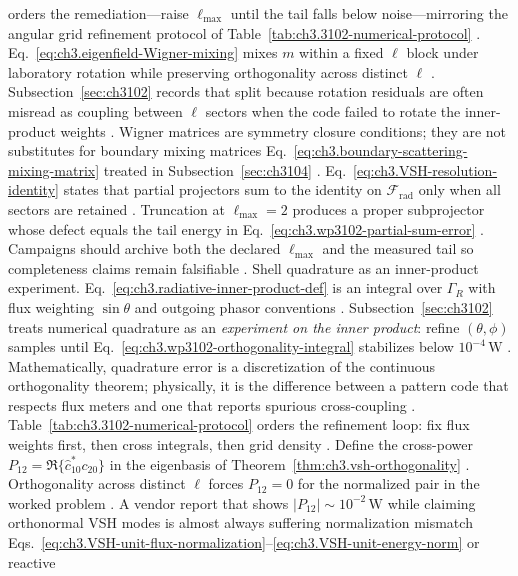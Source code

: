orders the remediation---raise \(\ell_{\max}\) until the tail falls below noise---mirroring the angular grid refinement protocol of
Table~\ref{tab:ch3.3102-numerical-protocol} \cite{stratton1941}.
Eq.~\eqref{eq:ch3.eigenfield-Wigner-mixing} mixes \(m\) within a fixed \(\ell\) block under laboratory rotation while preserving
orthogonality across distinct \(\ell\) \cite{jackson1999}. Subsection~\ref{sec:ch3102} records that split because rotation
residuals are often misread as coupling between \(\ell\) sectors when the code failed to rotate the inner-product weights
\cite{harrington2001}. Wigner matrices are symmetry closure conditions; they are not substitutes for boundary mixing matrices
Eq.~\eqref{eq:ch3.boundary-scattering-mixing-matrix} treated in Subsection~\ref{sec:ch3104} \cite{harrington2001}.
Eq.~\eqref{eq:ch3.VSH-resolution-identity} states that partial projectors sum to the identity on \(\mathcal{F}_{\mathrm{rad}}\) only when
all sectors are retained \cite{hansen1988}. Truncation at \(\ell_{\max}=2\) produces a proper subprojector whose defect equals the
tail energy in Eq.~\eqref{eq:ch3.wp3102-partial-sum-error} \cite{harrington2001}. Campaigns should archive both the declared
\(\ell_{\max}\) and the measured tail so completeness claims remain falsifiable \cite{devaney2004}.
Shell quadrature as an inner-product experiment. Eq.~\eqref{eq:ch3.radiative-inner-product-def} is an integral over \(\Gamma_R\) with flux weighting \(\sin\theta\) and outgoing phasor conventions
\cite{stratton1941}. Subsection~\ref{sec:ch3102} treats numerical quadrature as an \emph{experiment on the inner product}: refine
\((\theta,\phi)\) samples until Eq.~\eqref{eq:ch3.wp3102-orthogonality-integral} stabilizes below \(10^{-4}\,\mathrm{W}\)
\cite{hansen1988}. Mathematically, quadrature error is a discretization of the continuous orthogonality theorem; physically, it is the
difference between a pattern code that respects flux meters and one that reports spurious cross-coupling \cite{poynting1884}.
Table~\ref{tab:ch3.3102-numerical-protocol} orders the refinement loop: fix flux weights first, then cross integrals, then grid density
\cite{stratton1941}.
Define the cross-power \(P_{12}=\Re\{\widehat{c}_{10}^{*}c_{20}\}\) in the eigenbasis of Theorem~\ref{thm:ch3.vsh-orthogonality}
\cite{hansen1988}. Orthogonality across distinct \(\ell\) forces \(P_{12}=0\) for the normalized pair in the worked problem
\cite{stratton1941}. A vendor report that shows \(|P_{12}|\sim10^{-2}\,\mathrm{W}\) while claiming orthonormal VSH modes is
almost always suffering normalization mismatch Eqs.~\eqref{eq:ch3.VSH-unit-flux-normalization}--\eqref{eq:ch3.VSH-unit-energy-norm} or reactive
